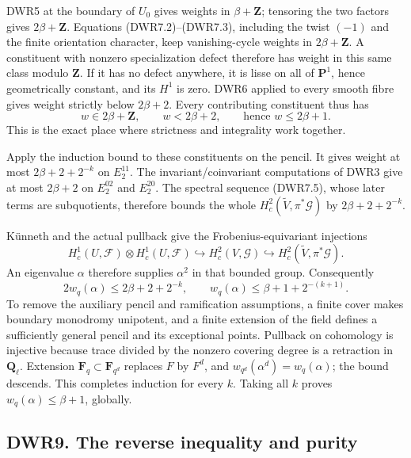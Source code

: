 DWR5 at the boundary of \(U_0\) gives weights in \(\beta+\mathbf Z\);
tensoring the two factors gives \(2\beta+\mathbf Z\). Equations
(DWR7.2)--(DWR7.3), including the twist \((-1)\) and the finite
orientation character, keep vanishing-cycle weights in
\(2\beta+\mathbf Z\). A constituent with nonzero specialization defect
therefore has weight in this same class modulo \(\mathbf Z\). If it has
no defect anywhere, it is lisse on all of \(\mathbf P^1\), hence
geometrically constant, and its \(H^1\) is zero. DWR6 applied to every
smooth fibre gives weight strictly below \(2\beta+2\). Every
contributing constituent thus has \[
w\in2\beta+\mathbf Z,\qquad w<2\beta+2,
\qquad\text{hence }w\le2\beta+1.
\tag{DWR8.5}
\] This is the exact place where strictness and integrality work
together.

Apply the induction bound to these constituents on the pencil. It gives
weight at most \(2\beta+2+2^{-k}\) on \(E_2^{11}\). The
invariant/coinvariant computations of DWR3 give at most \(2\beta+2\) on
\(E_2^{02}\) and \(E_2^{20}\). The spectral sequence (DWR7.5), whose
later terms are subquotients, therefore bounds the whole
\(H_c^2(\widetilde V,\pi^*\mathcal G)\) by \(2\beta+2+2^{-k}\).

Künneth and the actual pullback give the Frobenius-equivariant
injections \[
H_c^1(U,\mathcal F)\otimes H_c^1(U,\mathcal F)
\hookrightarrow H_c^2(V,\mathcal G)
\hookrightarrow H_c^2(\widetilde V,\pi^*\mathcal G).
\tag{DWR8.6}
\] An eigenvalue \(\alpha\) therefore supplies \(\alpha^2\) in that
bounded group. Consequently \[
2w_q(\alpha)\le2\beta+2+2^{-k},
\qquad w_q(\alpha)\le\beta+1+2^{-(k+1)}.
\tag{DWR8.7}
\] To remove the auxiliary pencil and ramification assumptions, a finite
cover makes boundary monodromy unipotent, and a finite extension of the
field defines a sufficiently general pencil and its exceptional points.
Pullback on cohomology is injective because trace divided by the nonzero
covering degree is a retraction in \(\mathbf Q_\ell\). Extension
\(\mathbf F_q\subset\mathbf F_{q^d}\) replaces \(F\) by \(F^d\), and
\(w_{q^d}(\alpha^d)=w_q(\alpha)\); the bound descends. This completes
induction for every \(k\). Taking all \(k\) proves
\(w_q(\alpha)\le\beta+1\), globally.

\subsection{DWR9. The reverse inequality and
purity}\label{dwr9.-the-reverse-inequality-and-purity}

